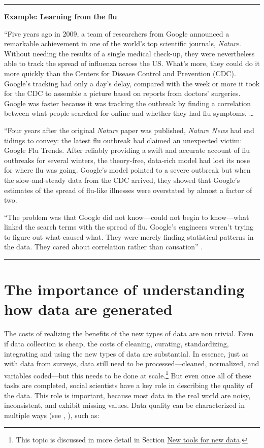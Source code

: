 \documentclass[]{krantz}
\begin{document}
\begin{center}\rule{0.5\linewidth}{\linethickness}\end{center}

\textbf{Example: Learning from the flu}

``Five years ago in 2009, a team of researchers from Google announced a
remarkable achievement in one of the world's top scientific journals,
\emph{Nature}. Without needing the results of a single medical check-up,
they were nevertheless able to track the spread of influenza across the
US. What's more, they could do it more quickly than the Centers for
Disease Control and Prevention (CDC). Google's tracking had only a day's
delay, compared with the week or more it took for the CDC to assemble a
picture based on reports from doctors' surgeries. Google was faster
because it was tracking the outbreak by finding a correlation between
what people searched for online and whether they had flu symptoms.
\ldots{}

``Four years after the original \emph{Nature} paper was published,
\emph{Nature News} had sad tidings to convey: the latest flu outbreak
had claimed an unexpected victim: Google Flu Trends. After reliably
providing a swift and accurate account of flu outbreaks for several
winters, the theory-free, data-rich model had lost its nose for where
flu was going. Google's model pointed to a severe outbreak but when the
slow-and-steady data from the CDC arrived, they showed that Google's
estimates of the spread of flu-like illnesses were overstated by almost
a factor of two.

``The problem was that Google did not know---could not begin to
know---what linked the search terms with the spread of flu. Google's
engineers weren't trying to figure out what caused what. They were
merely finding statistical patterns in the data. They cared about
correlation rather than causation'' \citep{harford2014big}.

\begin{center}\rule{0.5\linewidth}{\linethickness}\end{center}

\section{The importance of understanding how data are
generated}\label{sec:1-4}

The costs of realizing the benefits of the new types of data are non
trivial. Even if data collection is cheap, the costs of cleaning,
curating, standardizing, integrating and using the new types of data are
substantial. In essence, just as with data from surveys, data still need
to be processed---cleaned, normalized, and variables coded---but this
needs to be done at scale.\footnote{This topic is discussed in more
  detail in Section \protect\hyperlink{sec:1-5}{New tools for new data}.}
But even once all of these tasks are completed, social scientists have a
key role in describing the quality of the data. This role is important,
because most data in the real world are noisy, inconsistent, and exhibit
missing values. Data quality can be characterized in multiple ways (see
\citet{christen2012data}, \citet{national2018federal}), such as:
\end{document}

